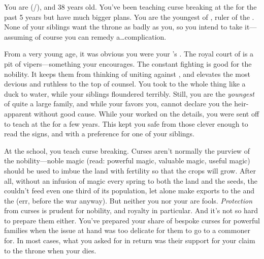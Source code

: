\documentclass[char]{GL2020}
\begin{document}
\name{\cPrince{}}

You are \cPrince{\full} (\cPrince{\they}/\cPrince{\them}), and 38 years old. You've been teaching curse breaking at the \pSchool{} for the past 5 years but have much bigger plans. You are the youngest \cPrince{\child} of \cQueen{\full}, ruler of the \pFarm{}. None of your siblings want the throne as badly as you, so you intend to take it---assuming of course you can remedy a\ldots{}complication.

From a very young age, it was obvious you were your \cQueen{\parent}'s \cPrince{\child}. The royal court of \pFarm{} is a pit of vipers---something your \cQueen{\parent} encourages. The constant fighting is good for the nobility. It keeps them from thinking of uniting against \cQueen{\them}, and elevates the most devious and ruthless to the top of \cQueen{\their} counsel. You took to the whole thing like a duck to water, while your siblings floundered terribly.  Still, you are the \emph{youngest} of quite a large family, and while your \cQueen{\parent} favors you, \cQueen{\they} cannot declare you the heir-apparent without good cause. While your \cQueen{\parent} worked on the details, you were sent off to teach at the \pSchool{} for a few years. This kept you safe from those clever enough to read the signs, and with a preference for one of your siblings.

At the school, you teach curse breaking. Curses aren't normally the purview of the nobility---noble magic (read: powerful magic, valuable magic, useful magic) should be used to imbue the land with fertility so that the crops will grow. After all, without an infusion of magic every spring to both the land and the seeds, the \pFarm{} couldn't feed even one third of its population, let alone make exports to the \pTech{} and the \pShip{} (err, before the war anyway). But neither you nor your \cQueen{\parent} are fools. \emph{Protection} from curses is prudent for nobility, and royalty in particular. And it's not so hard to prepare them either. You've prepared your share of bespoke curses for powerful families when the issue at hand was too delicate for them to go to a commoner for. In most cases, what you asked for in return was their support for your claim to the throne when your \cQueen{\parent} dies.
\end{document}
